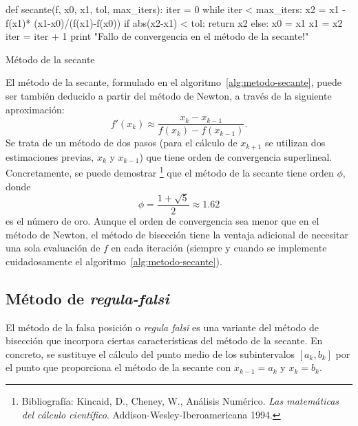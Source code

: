 \begin{algorithm}  \begin{python}
def secante(f, x0, x1, tol, max_iters):
    iter = 0
    while iter < max_iters:
        x2 = x1 - f(x1)* (x1-x0)/(f(x1)-f(x0))
        if abs(x2-x1) < tol: 
            return x2
        else:
            x0 = x1
            x1 = x2
            iter = iter + 1        
    print "Fallo de convergencia en el método de la secante!"
\end{python}
\caption{Método de la secante}
\label{alg:metodo-secante}
\end{algorithm}
El método de la secante, formulado en el
algoritmo~\ref{alg:metodo-secante}, puede ser también deducido a
partir del método de Newton, a través de la siguiente aproximación:
\begin{equation*}
  f'(x_k) \approx  \frac{x_k-x_{k-1}}{f(x_k)-f(x_{k-1})}.
\end{equation*}
Se trata de un método de dos pasos (para el cálculo de $x_{k+1}$ se
utilizan dos estimaciones previas, $x_k$ y $x_{k-1}$) que tiene orden
de convergencia superlineal. Concretamente, se puede demostrar%
\footnote{\textsf{Bibliografía}: Kincaid, D., Cheney, W., Análisis
  Numérico. \textit{Las matemáticas del cálculo
    científico}. Addison-Wesley-Iberoamericana 1994.}  que el método
de la secante tiene orden $\phi$, donde
$$
\phi=\frac{1 + \sqrt 5}{2} \approx 1.62
$$
es el número de oro. Aunque el orden de convergencia sea menor que en
el método de Newton, el método de bisección tiene la ventaja adicional
de necesitar una sola evaluación de $f$ en cada iteración (siempre y
cuando se implemente cuidadosamente el algoritmo~\ref{alg:metodo-secante}).

\subsection{Método de \emph{regula-falsi}}
\label{sec:metodo-de-regula-falsi}

El método de la falsa posición o \emph{regula falsi} es una variante del
método de bisección que incorpora ciertas características del método
de la secante. En concreto, se sustituye el cálculo del punto medio de
los subintervalos $[a_k,b_k]$ por el punto que proporciona el método
de la secante con $x_{k-1}=a_k$ y $x_k=b_k$.

